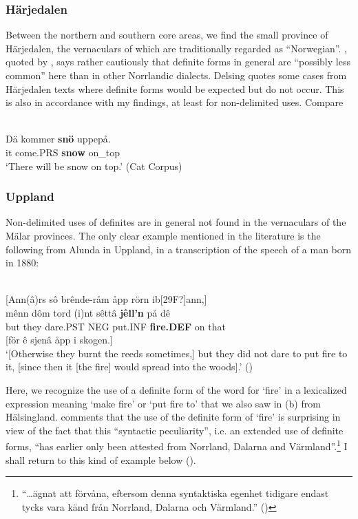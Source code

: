 \subsubsection{Härjedalen}
 Between the northern and southern core areas, we find the small province of Härjedalen, the vernaculars of which are traditionally regarded as “Norwegian”. \citet[28]{Reinhammar1973}, quoted by \citet[19]{Delsing2003a}, says rather cautiously that definite forms in general are “possibly less common” here than in other Norrlandic dialects. Delsing quotes some cases from Härjedalen texts where definite forms would be expected but do not occur. This is also in accordance with my findings, at least for non-delimited uses. Compare

\ea \label{} 
\\
\gll Dä  kommer  \textbf{snö} uppepå.\\
it  come.PRS  \textbf{snow} on\_top\\
\glt ‘There will be snow on top.’ (Cat Corpus)

\z

\subsubsection{Uppland}
Non-delimited uses of definites are in general not found in the vernaculars of the Mälar provinces. The only clear example mentioned in the literature is the following from Alunda in Uppland, in a transcription of the speech of a man born in 1880:

\ea \label{} 
\\ \label{bkm:Ref154222780}
 {}[Ann(â)rs sô brênde-råm åpp rörn ib[29F?]ann,] \\
\gll mênn  dôm  tord  (i)nt  sêttâ  \textbf{jêll’n} på  dê  \\
but  they  dare.PST  NEG  put.INF  \textbf{fire.DEF} on   that  \\
{} [för ê sjenâ åpp i skogen.]\\
\glt ‘[Otherwise they burnt the reeds sometimes,] but they did not dare to put fire to it, [since then it [the fire] would spread into the woods].’ (\citet[60]{Västerlund1988})

\z

Here, we recognize the use of a definite form of the word for ‘fire’ in a lexicalized expression meaning ‘make fire’ or ‘put fire to’ that we also saw in (b) from Hälsingland. \citet[40]{Västerlund1988} comments that the use of the definite form of  ‘fire’ is surprising in view of the fact that this “syntactic peculiarity”, i.e. an extended use of definite forms, “has earlier only been attested from Norrland, Dalarna and Värmland”.\footnote{ “…ägnat att förvåna, eftersom denna syntaktiska egenhet tidigare endast tycks vara känd från Norrland, Dalarna och Värmland.” (\citet[60]{Västerlund1988})} I shall return to this kind of example below ().

